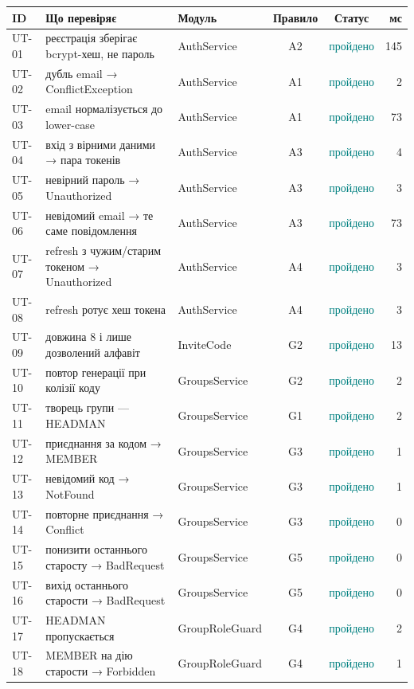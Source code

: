 \begin{longtable}{@{}l L{4.8cm} L{3.7cm} c c r@{}}
\toprule
ID & Що перевіряє & Модуль & Правило & Статус & мс\\
\midrule\endhead
UT-01 & реєстрація зберігає bcrypt-хеш, не пароль & AuthService & A2 & \textcolor{teal}{пройдено} & 145\\
UT-02 & дубль email → ConflictException & AuthService & A1 & \textcolor{teal}{пройдено} & 2\\
UT-03 & email нормалізується до lower-case & AuthService & A1 & \textcolor{teal}{пройдено} & 73\\
UT-04 & вхід з вірними даними → пара токенів & AuthService & A3 & \textcolor{teal}{пройдено} & 4\\
UT-05 & невірний пароль → Unauthorized & AuthService & A3 & \textcolor{teal}{пройдено} & 3\\
UT-06 & невідомий email → те саме повідомлення & AuthService & A3 & \textcolor{teal}{пройдено} & 73\\
UT-07 & refresh з чужим/старим токеном → Unauthorized & AuthService & A4 & \textcolor{teal}{пройдено} & 3\\
UT-08 & refresh ротує хеш токена & AuthService & A4 & \textcolor{teal}{пройдено} & 3\\
UT-09 & довжина 8 і лише дозволений алфавіт & InviteCode & G2 & \textcolor{teal}{пройдено} & 13\\
UT-10 & повтор генерації при колізії коду & GroupsService & G2 & \textcolor{teal}{пройдено} & 2\\
UT-11 & творець групи — HEADMAN & GroupsService & G1 & \textcolor{teal}{пройдено} & 2\\
UT-12 & приєднання за кодом → MEMBER & GroupsService & G3 & \textcolor{teal}{пройдено} & 1\\
UT-13 & невідомий код → NotFound & GroupsService & G3 & \textcolor{teal}{пройдено} & 1\\
UT-14 & повторне приєднання → Conflict & GroupsService & G3 & \textcolor{teal}{пройдено} & 0\\
UT-15 & понизити останнього старосту → BadRequest & GroupsService & G5 & \textcolor{teal}{пройдено} & 0\\
UT-16 & вихід останнього старости → BadRequest & GroupsService & G5 & \textcolor{teal}{пройдено} & 0\\
UT-17 & HEADMAN пропускається & GroupRoleGuard & G4 & \textcolor{teal}{пройдено} & 2\\
UT-18 & MEMBER на дію старости → Forbidden & GroupRoleGuard & G4 & \textcolor{teal}{пройдено} & 1\\

\end{longtable}
